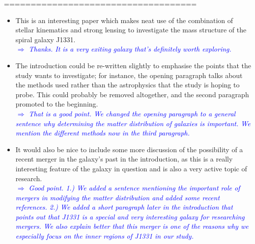 \documentclass[10pt,a4paper]{article}
\newcommand{\Comment}[1]{\textsl{\textcolor{Blue}{$\Longrightarrow$ {#1}}}}
\begin{document}
====================================
\begin{itemize}

\item This is an interesting paper which makes neat use of the combination of stellar
kinematics and strong lensing to investigate the mass structure of the spiral galaxy
J1331. \\\Comment{Thanks. It is a very exiting galaxy that's definitely worth exploring.}

\item The introduction could be re-written slightly to emphasise the points that the study
wants to investigate; for instance, the opening paragraph talks about the methods
used rather than the astrophysics that the study is hoping to probe. This could
probably be removed altogether, and the second paragraph promoted to the beginning. \\\Comment{That is a good point. We changed the opening paragraph to a general sentence why determining the matter distribution of galaxies is important. We mention the different methods now in the third paragraph.}

\item It would also be nice to include some more discussion of the possibility of a recent
merger in the galaxy's past in the introduction, as this is a really interesting
feature of the galaxy in question and is also a very active topic of research. \\\Comment{Good point. 1.) We added a sentence mentioning the important role of mergers in modifying the matter distribution and added some recent references. 2.) We added a short paragraph later in the introduction that points out that J1331 is a special and very interesting galaxy for researching mergers. We also explain better that this merger is one of the reasons why we especially focus on the inner regions of J1331 in our study.}


\end{itemize}
\end{document}

